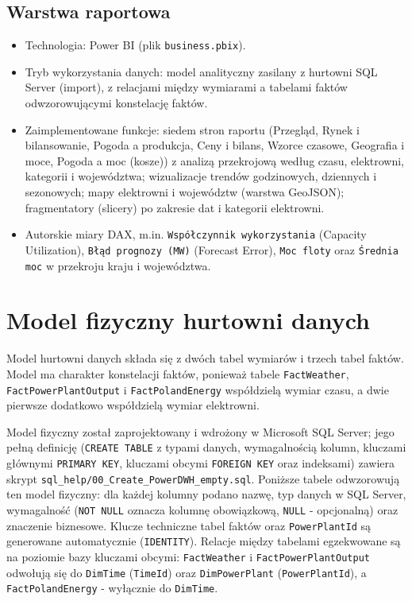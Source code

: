 \documentclass[12pt]{article}
\begin{document}
	\subsection{Warstwa raportowa}
	\begin{itemize}
		\item Technologia: Power BI (plik \texttt{business.pbix}).
		\item Tryb wykorzystania danych: model analityczny zasilany z hurtowni SQL Server (import), z relacjami między wymiarami a tabelami faktów odwzorowującymi konstelację faktów.
		\item Zaimplementowane funkcje: siedem stron raportu (Przegląd, Rynek i bilansowanie, Pogoda a produkcja, Ceny i bilans, Wzorce czasowe, Geografia i moce, Pogoda a moc (kosze)) z analizą przekrojową według czasu, elektrowni, kategorii i województwa; wizualizacje trendów godzinowych, dziennych i sezonowych; mapy elektrowni i województw (warstwa GeoJSON); fragmentatory (slicery) po zakresie dat i kategorii elektrowni.
		\item Autorskie miary DAX, m.in. \texttt{Współczynnik wykorzystania} (Capacity Utilization), \texttt{Błąd prognozy (MW)} (Forecast Error), \texttt{Moc floty} oraz \texttt{Średnia moc} w przekroju kraju i województwa.
	\end{itemize}

	\newpage
	\section{Model fizyczny hurtowni danych}

	Model hurtowni danych składa się z dwóch tabel wymiarów i trzech tabel faktów. Model ma charakter konstelacji faktów, ponieważ tabele \texttt{FactWeather}, \texttt{FactPowerPlantOutput} i \texttt{FactPolandEnergy} współdzielą wymiar czasu, a dwie pierwsze dodatkowo współdzielą wymiar elektrowni.

	Model fizyczny został zaprojektowany i wdrożony w Microsoft SQL Server; jego pełną definicję (\texttt{CREATE TABLE} z typami danych, wymagalnością kolumn, kluczami głównymi \texttt{PRIMARY KEY}, kluczami obcymi \texttt{FOREIGN KEY} oraz indeksami) zawiera skrypt \texttt{sql\_help/00\_Create\_PowerDWH\_empty.sql}. Poniższe tabele odwzorowują ten model fizyczny: dla każdej kolumny podano nazwę, typ danych w SQL Server, wymagalność (\texttt{NOT NULL} oznacza kolumnę obowiązkową, \texttt{NULL} - opcjonalną) oraz znaczenie biznesowe. Klucze techniczne tabel faktów oraz \texttt{PowerPlantId} są generowane automatycznie (\texttt{IDENTITY}). Relacje między tabelami egzekwowane są na poziomie bazy kluczami obcymi: \texttt{FactWeather} i \texttt{FactPowerPlantOutput} odwołują się do \texttt{DimTime} (\texttt{TimeId}) oraz \texttt{DimPowerPlant} (\texttt{PowerPlantId}), a \texttt{FactPolandEnergy} - wyłącznie do \texttt{DimTime}.
\end{document}
